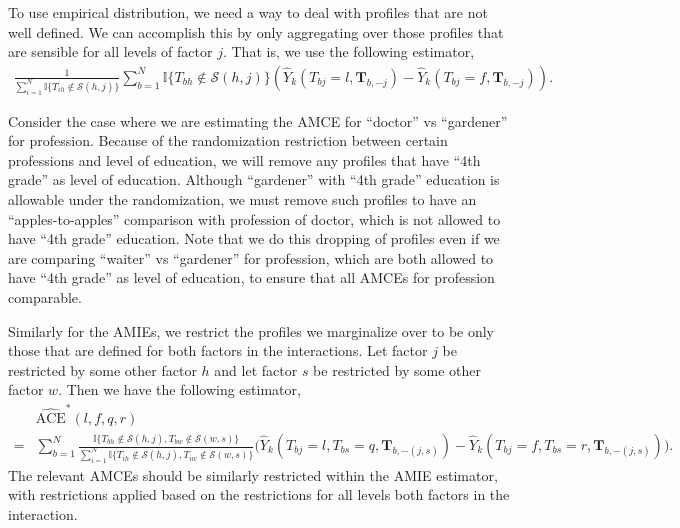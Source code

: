 To use empirical distribution, we need a way to deal with profiles
that are not well defined.  We can accomplish this by only aggregating
over those profiles that are sensible for all levels of factor $j$.
That is, we use the following  estimator,
 \begin{align*}
\frac{1}{\sum_{i=1}^N\mathbb{I}\{T_{ih} \notin \mathcal{S}(h,
   j)\}}\sum_{b =1}^N \mathbb{I}\{T_{bh} \notin \mathcal{S}(h, j)\}\left(\widehat{Y}_k(T_{bj}=l,\bm{T}_{b,-j} ) -\widehat{Y}_k(T_{bj}=f,\bm{T}_{b,-j}) \right).
\end{align*}

Consider the case where we are estimating the AMCE for ``doctor'' vs ``gardener'' for profession.
Because of the randomization restriction between certain professions and level of education, we will remove any profiles that have ``4th grade'' as level of education.
Although ``gardener'' with ``4th grade'' education is allowable under the randomization, we must remove such profiles to have an ``apples-to-apples'' comparison with profession of doctor, which is not allowed to have ``4th grade'' education.
Note that we do this dropping of profiles even if we are comparing ``waiter'' vs ``gardener'' for profession, which are both allowed to have ``4th grade'' as level of education, to ensure that all AMCEs for profession comparable.

Similarly for the AMIEs, we restrict the profiles we marginalize over
to be only those that are defined for both factors in the
interactions.  Let factor $j$ be restricted by some other factor $h$
and let factor $s$ be restricted by some other factor $w$.  Then we
have the following estimator,
 \begin{align*}
& \widehat{\text{ACE}}^*(l,f, q, r)\\
= &\sum_{b=1}^N\frac{\mathbb{I}\{T_{bh} \notin \mathcal{S}(h, j),
    T_{bw} \notin \mathcal{S}(w, s)\}}{\sum_{i=1}^N\mathbb{I}\{T_{ih}
    \notin \mathcal{S}(h, j), T_{iw} \notin \mathcal{S}(w,
    s)\}}\Big(\widehat{Y}_k(T_{bj}=l,T_{bs}=q, \bm{T}_{b,-(j,s)}
    )-\widehat{Y}_k(T_{bj}=f,T_{bs}=r,\bm{T}_{b,-(j,s)})\Big). 
\end{align*}
The relevant AMCEs should be similarly restricted within the AMIE
estimator, with restrictions applied based on the restrictions for all levels
both factors in the interaction. 

